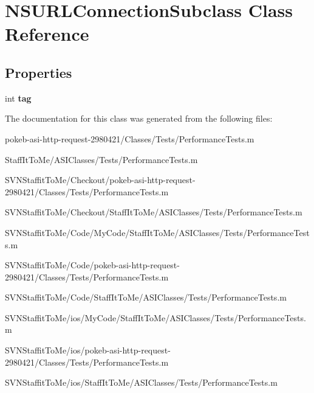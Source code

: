 \hypertarget{interface_n_s_u_r_l_connection_subclass}{
\section{\-N\-S\-U\-R\-L\-Connection\-Subclass \-Class \-Reference}
\label{interface_n_s_u_r_l_connection_subclass}
}
\subsection*{\-Properties}
\begin{DoxyCompactItemize}
\item 
\hypertarget{interface_n_s_u_r_l_connection_subclass_a77e25e3c651bf20619362ddb1d36f01c}{
int {\bfseries tag}}
\label{interface_n_s_u_r_l_connection_subclass_a77e25e3c651bf20619362ddb1d36f01c}

\end{DoxyCompactItemize}


\-The documentation for this class was generated from the following files\-:\begin{DoxyCompactItemize}
\item 
pokeb-\/asi-\/http-\/request-\/2980421/\-Classes/\-Tests/\-Performance\-Tests.\-m\item 
\-Staff\-It\-To\-Me/\-A\-S\-I\-Classes/\-Tests/\-Performance\-Tests.\-m\item 
\-S\-V\-N\-Staffit\-To\-Me/\-Checkout/pokeb-\/asi-\/http-\/request-\/2980421/\-Classes/\-Tests/\-Performance\-Tests.\-m\item 
\-S\-V\-N\-Staffit\-To\-Me/\-Checkout/\-Staff\-It\-To\-Me/\-A\-S\-I\-Classes/\-Tests/\-Performance\-Tests.\-m\item 
\-S\-V\-N\-Staffit\-To\-Me/\-Code/\-My\-Code/\-Staff\-It\-To\-Me/\-A\-S\-I\-Classes/\-Tests/\-Performance\-Tests.\-m\item 
\-S\-V\-N\-Staffit\-To\-Me/\-Code/pokeb-\/asi-\/http-\/request-\/2980421/\-Classes/\-Tests/\-Performance\-Tests.\-m\item 
\-S\-V\-N\-Staffit\-To\-Me/\-Code/\-Staff\-It\-To\-Me/\-A\-S\-I\-Classes/\-Tests/\-Performance\-Tests.\-m\item 
\-S\-V\-N\-Staffit\-To\-Me/ios/\-My\-Code/\-Staff\-It\-To\-Me/\-A\-S\-I\-Classes/\-Tests/\-Performance\-Tests.\-m\item 
\-S\-V\-N\-Staffit\-To\-Me/ios/pokeb-\/asi-\/http-\/request-\/2980421/\-Classes/\-Tests/\-Performance\-Tests.\-m\item 
\-S\-V\-N\-Staffit\-To\-Me/ios/\-Staff\-It\-To\-Me/\-A\-S\-I\-Classes/\-Tests/\-Performance\-Tests.\-m\end{DoxyCompactItemize}
